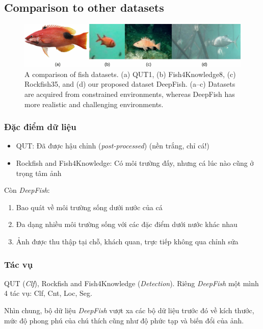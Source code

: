 \documentclass{article}
\begin{document}
        \subsection{Comparison to other datasets}
        \begin{figure}[ht!]
            \centering
            \includegraphics[width = \linewidth]{fig2.jpg}
            \caption{A comparison of fish datasets. (a) QUT1, (b) Fish4Knowledge8, (c) Rockfish35, and (d) our proposed dataset DeepFish. (a–c) Datasets are acquired from constrained environments, whereas DeepFish has more realistic and challenging environments.}
            \label{fig2}
        \end{figure}
        \subsubsection*{Đặc điểm dữ liệu}
            \begin{itemize}
                \item QUT: Đã được hậu chỉnh (\textit{post-processed}) (nền trắng, chỉ cá!)
                \item Rockfish and Fish4Knowledge: Có môi trường đấy, nhưng cá lúc nào cũng ở trọng tâm ảnh
            \end{itemize}
            Còn \textit{DeepFish}:
            \begin{enumerate}
                \item Bao quát về môi trường sống dưới nước của cá
                \item Đa dạng nhiều môi trường sống với các đặc điểm dưới nước khác nhau
                \item Ảnh được thu thập tại chỗ, khách quan, trực tiếp không qua chỉnh sửa
            \end{enumerate}
        \subsubsection*{Tác vụ}
            QUT (\textit{Clf}), Rockfish and Fish4Knowledge (\textit{Detection}). Riêng \textit{DeepFish} một mình 4 tác vụ: Clf, Cnt, Loc, Seg.

        Nhìn chung, bộ dữ liệu \textit{DeepFish} vượt xa các bộ dữ liệu trước đó về kích thước, mức độ phong phú của chú thích cũng như độ phức tạp và biến đổi của ảnh.
\end{document}
